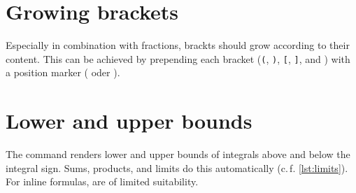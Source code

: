 \begin{table}[H]
\end{table}

\section{Growing brackets}

Especially in combination with fractions, brackts should grow according to their content.
This can be achieved by prepending each bracket (\texttt{(}, \texttt{)}, \texttt{[}, \texttt{]}, \texttt{\lbrace} and \texttt{\rbrace}) with a position marker (\texttt{\left} oder \texttt{\right}).


\section{Lower and upper bounds}

The \texttt{\limits} command renders lower and upper bounds of integrals above and below the integral sign.
Sums, products, and limits do this 
automatically (c.\,f. \cref{lst:limits}).
For inline formulas, \texttt{\limits} are of limited suitability.

